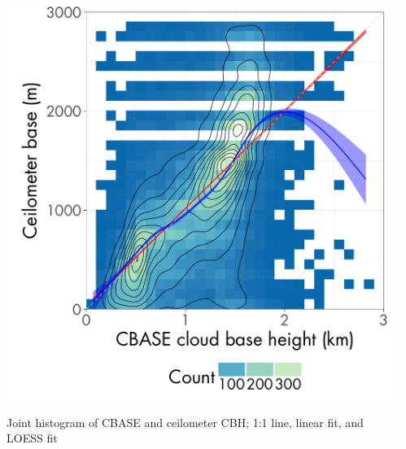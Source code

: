 \documentclass[final,t,12pt]{beamer}\usepackage[]{graphicx}\usepackage[]{color}
\newenvironment{knitrout}{}{} %
\begin{document}
\begin{frame}[fragile]{}
\begin{tcolorbox}
\begin{tcbitemize}[raster equal height=rows, raster columns = 11
      ]
\begin{tcbitemize}[raster columns=1]
\begin{columns}
\begin{column}{0.5\linewidth}
\begin{knitrout}
{\centering \includegraphics[width=\textwidth]{figure/cfmip-cbase-170926-combo-plot-1} 

}



\end{knitrout}
            {\small \quad Joint histogram of CBASE and ceilometer CBH; 1:1 \quad
              line, linear
              fit, and LOESS fit }
          \end{column}
          \begin{column}{0.5\linewidth}
\begin{knitrout}
\color{fgcolor}


\end{knitrout}
\end{column}
\end{columns}
\end{tcbitemize}
\end{tcbitemize}
\end{tcolorbox}
\end{frame}
\end{document}
